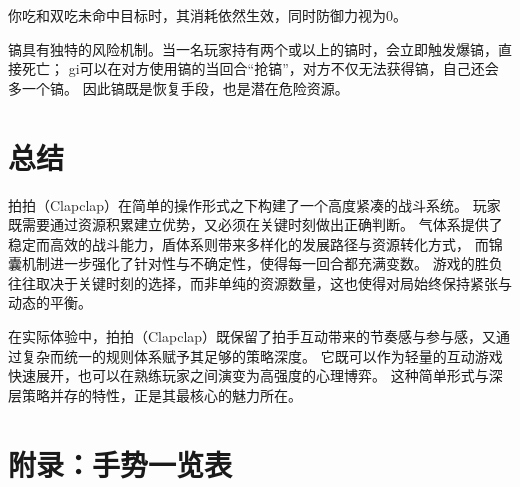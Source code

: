 \documentclass[12pt]{ctexart}
\begin{document}
你吃和双吃未命中目标时，其消耗依然生效，同时防御力视为0。

镐具有独特的风险机制。当一名玩家持有两个或以上的镐时，会立即触发爆镐，直接死亡；
gi可以在对方使用镐的当回合“抢镐”，对方不仅无法获得镐，自己还会多一个镐。
因此镐既是恢复手段，也是潜在危险资源。

\section{总结}

拍拍（Clapclap）在简单的操作形式之下构建了一个高度紧凑的战斗系统。
玩家既需要通过资源积累建立优势，又必须在关键时刻做出正确判断。
气体系提供了稳定而高效的战斗能力，盾体系则带来多样化的发展路径与资源转化方式，
而锦囊机制进一步强化了针对性与不确定性，使得每一回合都充满变数。
游戏的胜负往往取决于关键时刻的选择，而非单纯的资源数量，这也使得对局始终保持紧张与动态的平衡。

在实际体验中，拍拍（Clapclap）既保留了拍手互动带来的节奏感与参与感，又通过复杂而统一的规则体系赋予其足够的策略深度。
它既可以作为轻量的互动游戏快速展开，也可以在熟练玩家之间演变为高强度的心理博弈。
这种简单形式与深层策略并存的特性，正是其最核心的魅力所在。

\section*{附录：手势一览表}

\renewcommand\arraystretch{1.3}
\end{document}
